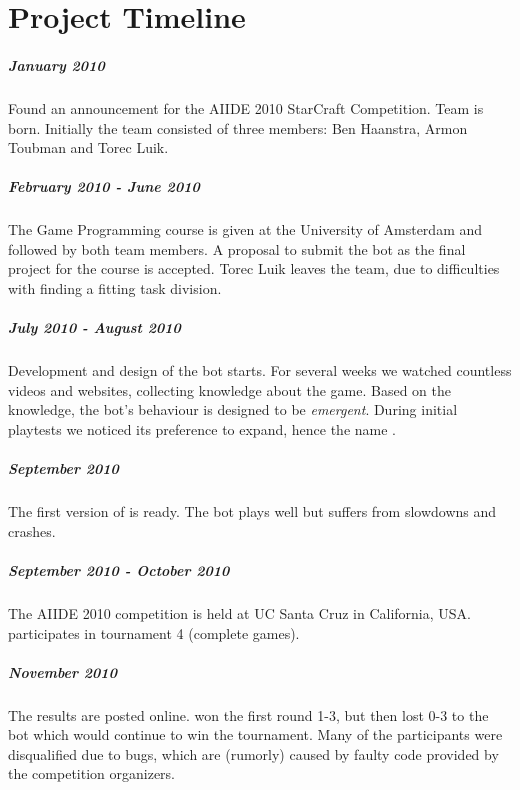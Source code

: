 
\chapter{Project Timeline}
\label{chap:timeline}

\paragraph{January 2010}
Found an announcement for the AIIDE 2010 StarCraft Competition. Team \massexpand is born. Initially the team consisted of three members: Ben Haanstra, Armon Toubman and Torec Luik.

\paragraph{February 2010 - June 2010}
The Game Programming course is given at the University of Amsterdam and followed by both team members. A proposal to submit the bot as the final project for the course is accepted. Torec Luik leaves the team, due to difficulties with finding a fitting task division.

\paragraph{July 2010 - August 2010}
Development and design of the bot starts. For several weeks we watched countless videos and websites, collecting knowledge about the game. Based on the knowledge, the bot's behaviour is designed to be \emph{emergent}. During initial playtests we noticed its preference to expand, hence the name \massexpand{}.

\paragraph{September 2010}
The first version of \massexpand is ready. The bot plays well but suffers from slowdowns and crashes.

\paragraph{September 2010 - October 2010}
The AIIDE 2010 competition is held at UC Santa Cruz in California, USA. \massexpand participates in tournament 4 (complete games).

\paragraph{November 2010}
The results are posted online. \massexpand won the first round 1-3, but then lost 0-3 to the bot which would continue to win the tournament. Many of the participants were disqualified due to bugs, which are (rumorly) caused by faulty code provided by the competition organizers.

